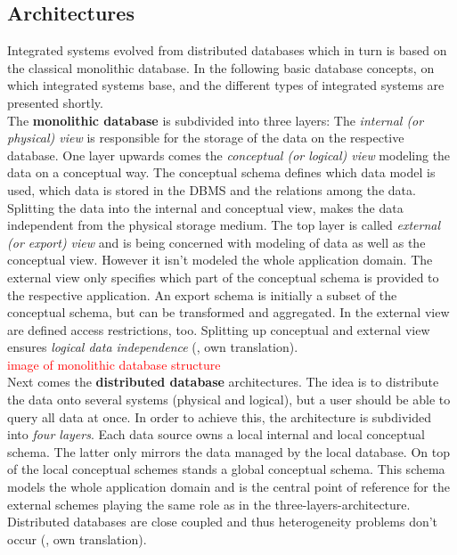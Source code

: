 \subsection{Architectures}

Integrated systems evolved from distributed databases which in turn is based on the classical monolithic database. In the following basic database concepts, on which integrated systems base, and the different types of integrated systems are presented shortly. \\
The \textbf{monolithic database} is subdivided into three layers: The \textit{internal (or physical) view} is responsible for the storage of the data on the respective database. One layer upwards comes the \textit{conceptual (or logical) view} modeling the data on a conceptual way. The conceptual schema defines which data model is used, which data is stored in the DBMS and the relations among the data.
Splitting the data into the internal and conceptual view, makes the data independent from the physical storage medium. The top layer is called \textit{external (or export) view} and is being concerned with modeling of data as well as the conceptual view. However it isn't modeled the whole application domain. The external view only specifies which part of the conceptual schema is provided to the respective application. An export schema is initially a subset of the conceptual schema, but can be transformed and aggregated. In the external view are defined access restrictions, too. Splitting up conceptual and external view ensures \textit{logical data independence} (\cite[p. 84/85]{DBLP:books/dp/LeserN2006}, own translation).\\

\textcolor{red}{image of monolithic database structure}\\

Next comes the \textbf{distributed database} architectures. The idea is to distribute the data onto several systems (physical and logical), but a user should be able to query all data at once. In order to achieve this, the architecture is subdivided into \textit{four layers}. Each data source owns a local internal and local conceptual schema. The latter only mirrors the data managed by the local database.  On top of the local conceptual schemes stands a global conceptual schema. This schema models the whole application domain and is the central point of reference for the external schemes playing the same role as in the three-layers-architecture.
Distributed databases are close coupled and thus heterogeneity problems don't occur (\cite[p. 91-93]{DBLP:books/dp/LeserN2006}, own translation).\\


